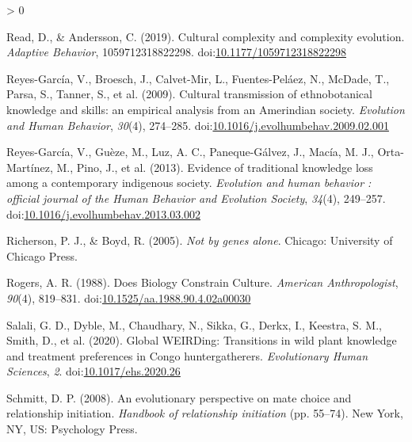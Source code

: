 \documentclass[
  11pt,
]{article}
\newlength{\cslhangindent}
\newenvironment{CSLReferences}[2] %
 {%
  \setlength{\parindent}{0pt}
  \ifodd #1 \everypar{\setlength{\hangindent}{\cslhangindent}}\ignorespaces\fi
  \ifnum #2 > 0
  \setlength{\parskip}{#2\baselineskip}
  \fi
 }%
 {}
\begin{document}
\begin{CSLReferences}{1}{0}
\leavevmode\hypertarget{ref-readCulturalComplexityComplexity2019}{}%
Read, D., \& Andersson, C. (2019). Cultural complexity and complexity evolution. \emph{Adaptive Behavior}, 1059712318822298. doi:\href{https://doi.org/10.1177/1059712318822298}{10.1177/1059712318822298}

\leavevmode\hypertarget{ref-reyes-garciaCulturalTransmissionEthnobotanical2009}{}%
Reyes-García, V., Broesch, J., Calvet-Mir, L., Fuentes-Peláez, N., McDade, T., Parsa, S., Tanner, S., et al. (2009). {Cultural transmission of ethnobotanical knowledge and skills: an empirical analysis from an Amerindian society}. \emph{Evolution and Human Behavior}, \emph{30}(4), 274--285. doi:\href{https://doi.org/10.1016/j.evolhumbehav.2009.02.001}{10.1016/j.evolhumbehav.2009.02.001}

\leavevmode\hypertarget{ref-reyes-garciaEvidenceTraditionalKnowledge2013}{}%
Reyes-García, V., Guèze, M., Luz, A. C., Paneque-Gálvez, J., Macía, M. J., Orta-Martínez, M., Pino, J., et al. (2013). Evidence of traditional knowledge loss among a contemporary indigenous society. \emph{Evolution and human behavior : official journal of the Human Behavior and Evolution Society}, \emph{34}(4), 249--257. doi:\href{https://doi.org/10.1016/j.evolhumbehav.2013.03.002}{10.1016/j.evolhumbehav.2013.03.002}

\leavevmode\hypertarget{ref-richersonNotGenesAlone2005}{}%
Richerson, P. J., \& Boyd, R. (2005). \emph{Not by genes alone}. {Chicago: University of Chicago Press}.

\leavevmode\hypertarget{ref-rogersDoesBiologyConstrain1988}{}%
Rogers, A. R. (1988). Does {Biology Constrain Culture}. \emph{American Anthropologist}, \emph{90}(4), 819--831. doi:\href{https://doi.org/10.1525/aa.1988.90.4.02a00030}{10.1525/aa.1988.90.4.02a00030}

\leavevmode\hypertarget{ref-salaliGlobalWEIRDingTransitions2020}{}%
Salali, G. D., Dyble, M., Chaudhary, N., Sikka, G., Derkx, I., Keestra, S. M., Smith, D., et al. (2020). Global {WEIRDing}: Transitions in wild plant knowledge and treatment preferences in {Congo} hunter{}gatherers. \emph{Evolutionary Human Sciences}, \emph{2}. doi:\href{https://doi.org/10.1017/ehs.2020.26}{10.1017/ehs.2020.26}

\leavevmode\hypertarget{ref-schmittEvolutionaryPerspectiveMate2008}{}%
Schmitt, D. P. (2008). An evolutionary perspective on mate choice and relationship initiation. \emph{Handbook of relationship initiation} (pp. 55--74). {New York, NY, US}: {Psychology Press}.


\end{CSLReferences}
\end{document}

